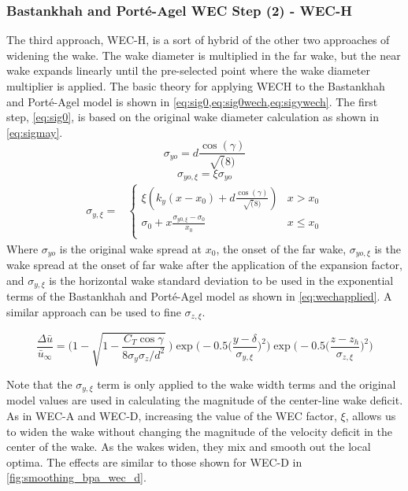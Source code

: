 \documentclass{jpconf}
\begin{document}
\subsubsection{Bastankhah and Port\'e-Agel WEC Step (2) - WEC-H}

The third approach, WEC-H, is a sort of hybrid of the other two approaches of widening the wake. The wake diameter is multiplied in the far wake, but the near wake expands linearly until the pre-selected point where the wake diameter multiplier is applied. The basic theory for applying WECH to the Bastankhah and Port\'{e}-Agel model is shown in \cref{eq:sig0,eq:sig0wech,eq:sigywech}. The first step, \cref{eq:sig0}, is based on the original wake diameter calculation as shown in \cref{eq:sigmay}.
%
\begin{equation}\label{eq:sig0}
	\sigma_{yo} = d\frac{\cos(\gamma)}{\sqrt(8)}
\end{equation}
%
\begin{equation}\label{eq:sig0wech}
	\sigma_{yo,\xi} = \xi \sigma_{yo}
\end{equation}
%
\begin{align}\label{eq:sigywech}
	\sigma_{y,\xi} = &
	\begin{cases}
		\xi (k_y (x-x_0) + d \frac{\cos(\gamma)}{\sqrt(8)}) & x > x_0 \\
		\sigma_0 + x \frac{\sigma_{y0,\xi}-\sigma_0}{x_0} & x \le x_0 \\
	\end{cases}
\end{align}
%
Where $\sigma_{yo}$ is the original wake spread at $x_0$, the onset of the far wake, $\sigma_{yo,\xi}$ is the wake spread at the onset of far wake after the application of the expansion factor, and $\sigma_{y,\xi}$ is the horizontal wake standard deviation to be used in the exponential terms of the Bastankhah and Port\'{e}-Agel model as shown in \cref{eq:wechapplied}. A similar approach can be used to fine $\sigma_{z,\xi}$.

\begin{equation}
	\frac{\Delta \bar{u}}{\bar{u}_{\infty}} = \Bigg(1-\sqrt{1-\frac{C_T \cos{\gamma}}{8 \sigma_y \sigma_z/d^2}}~\Bigg) \exp{\bigg(-0.5\Big(\frac{y-\delta}{ \sigma_{y,\xi}}\Big)^2\bigg)}\exp{\bigg(-0.5\Big(\frac{z-z_h}{ \sigma_{z,\xi}}\Big)^2\bigg)}
	\label{eq:wechapplied}
\end{equation}

Note that the $\sigma_{y,\xi}$ term is only applied to the wake width terms and the original model values are used in calculating the magnitude of the center-line wake deficit. As in WEC-A and WEC-D, increasing the value of the WEC factor, $\xi$, allows us to widen the wake without changing the magnitude of the velocity deficit in the center of the wake. As the wakes widen, they mix and smooth out the local optima. The effects are similar to those shown for WEC-D in \cref{fig:smoothing_bpa_wec_d}.
\end{document}
